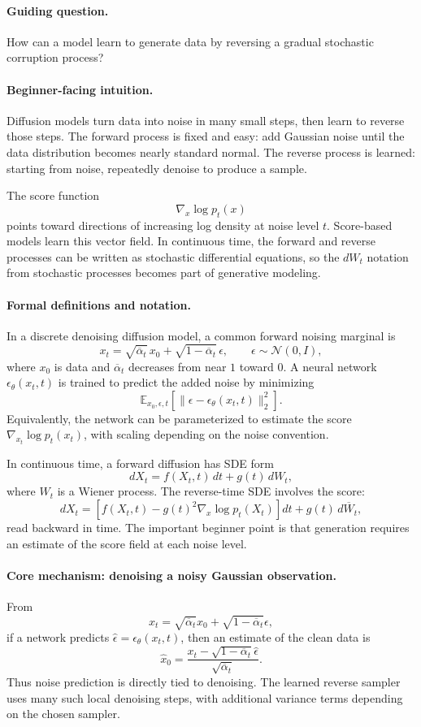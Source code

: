 \paragraph{Guiding question.}
How can a model learn to generate data by reversing a gradual stochastic corruption process?

\paragraph{Beginner-facing intuition.}
Diffusion models turn data into noise in many small steps, then learn to reverse those steps. The forward process is fixed and easy: add Gaussian noise until the data distribution becomes nearly standard normal. The reverse process is learned: starting from noise, repeatedly denoise to produce a sample.

The score function
\[
\nabla_x\log p_t(x)
\]
points toward directions of increasing log density at noise level \(t\). Score-based models learn this vector field. In continuous time, the forward and reverse processes can be written as stochastic differential equations, so the \(dW_t\) notation from stochastic processes becomes part of generative modeling.

\paragraph{Formal definitions and notation.}
In a discrete denoising diffusion model, a common forward noising marginal is
\[
x_t=\sqrt{\overline\alpha_t}\,x_0+\sqrt{1-\overline\alpha_t}\,\epsilon,
\qquad
\epsilon\sim\mathcal N(0,I),
\]
where \(x_0\) is data and \(\overline\alpha_t\) decreases from near \(1\) toward \(0\). A neural network \(\epsilon_\theta(x_t,t)\) is trained to predict the added noise by minimizing
\[
\boxed{
\mathbb{E}_{x_0,\epsilon,t}
\left[\|\epsilon-\epsilon_\theta(x_t,t)\|_2^2\right].
}
\]
Equivalently, the network can be parameterized to estimate the score \(\nabla_{x_t}\log p_t(x_t)\), with scaling depending on the noise convention.

In continuous time, a forward diffusion has SDE form
\[
dX_t=f(X_t,t)\,dt+g(t)\,dW_t,
\]
where \(W_t\) is a Wiener process. The reverse-time SDE involves the score:
\[
dX_t=\left[f(X_t,t)-g(t)^2\nabla_x\log p_t(X_t)\right]dt+g(t)\,d\overline W_t,
\]
read backward in time. The important beginner point is that generation requires an estimate of the score field at each noise level.

\paragraph{Core mechanism: denoising a noisy Gaussian observation.}
From
\[
x_t=\sqrt{\overline\alpha_t}x_0+\sqrt{1-\overline\alpha_t}\epsilon,
\]
if a network predicts \(\widehat\epsilon=\epsilon_\theta(x_t,t)\), then an estimate of the clean data is
\[
\widehat x_0
=\frac{x_t-\sqrt{1-\overline\alpha_t}\widehat\epsilon}
{\sqrt{\overline\alpha_t}}.
\]
Thus noise prediction is directly tied to denoising. The learned reverse sampler uses many such local denoising steps, with additional variance terms depending on the chosen sampler.

